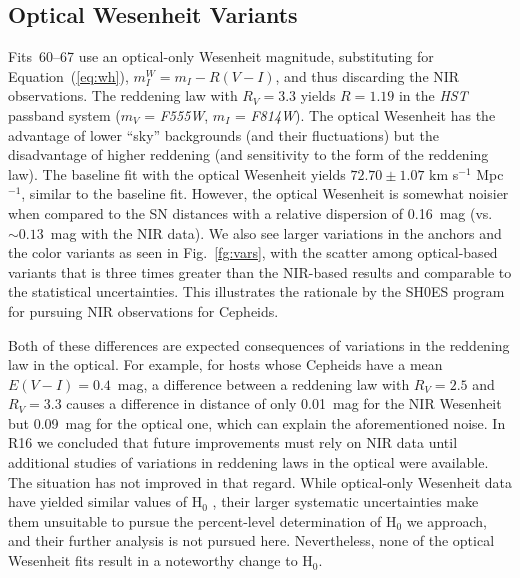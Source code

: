 \documentclass[12pt]{aastex631}
\newcommand{\hopt}{$ 72.70 \pm  1.07  $ km s$^{-1}$ Mpc$^{-1}$}
\begin{document}
\subsection{Optical Wesenheit Variants\label{sc:6.13}}
  
Fits~60--67 use an optical-only Wesenheit magnitude, substituting for Equation~(\ref{eq:wh}), $m^W_I=m_I-R(V\!-\!I)$, and thus discarding the NIR observations.  The \citet{Fitzpatrick:1999} reddening law with $R_V=3.3$ yields $R=1.19$ in the {\it HST} passband system ($m_V$ = {\it F555W}, $m_I$ = {\it F814W}).  The optical Wesenheit has the advantage of lower ``sky'' backgrounds (and their fluctuations) but the disadvantage of higher reddening (and sensitivity to the form of the reddening law).  The baseline fit with the optical Wesenheit yields \hopt, similar to the baseline fit.  However, the optical Wesenheit is somewhat noisier when compared to the SN distances with a relative dispersion of 0.16~mag (vs.~$\sim 0.13$~mag with the NIR data).  We also see larger variations in the anchors and the color variants as seen in Fig.~\ref{fg:vars}, with the scatter among optical-based variants that is three times greater than the NIR-based results and comparable to the statistical uncertainties.  This illustrates the rationale by the SH0ES program for pursuing NIR observations for Cepheids.

Both of these differences are expected consequences of variations in the reddening law in the optical.  For example, for hosts whose Cepheids have a mean $E(V\!-\!I)=0.4$~mag, a difference between a \citet{Fitzpatrick:1999} reddening law with $R_V=2.5$ and $R_V=3.3$ causes a difference in distance of only 0.01~mag for the NIR Wesenheit but 0.09~mag for the optical one, which can explain the aforementioned noise.  In R16 we concluded that future improvements must rely on NIR data until additional studies of variations in reddening laws in the optical were available.  The situation has not improved in that regard. While optical-only Wesenheit data have yielded similar values of H$_0$ \citep{freedman12,Riess:2016}, their larger systematic uncertainties make them unsuitable to pursue the percent-level determination of H$_0$ we approach, and their further analysis is not pursued here.   Nevertheless, none of the optical Wesenheit fits result in a noteworthy change to H$_0$.  
\end{document}
